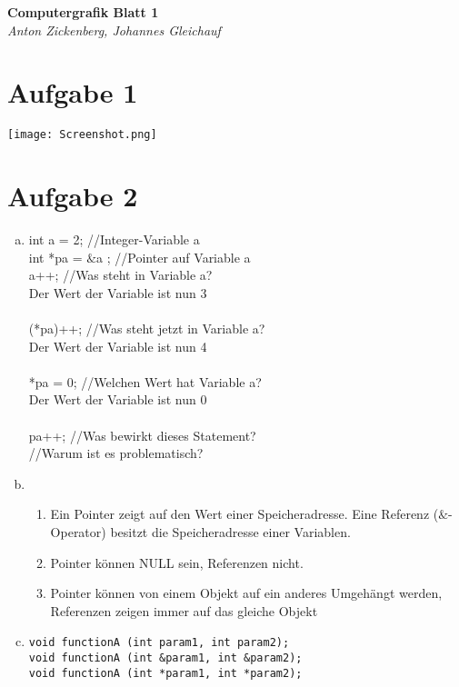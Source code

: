 \documentclass[12pt]{article}
\begin{document}
\begin{center}
 \textbf{\Large Computergrafik Blatt 1}\\
 \emph{Anton Zickenberg, Johannes Gleichauf}
\end{center}

\section*{Aufgabe 1}
\texttt{[image: Screenshot.png]}

\section*{Aufgabe 2}
\begin{enumerate}[a)]
\item int a = 2; //Integer-Variable a\\ 
	  int *pa = $\&$a ; //Pointer auf Variable a\\ 
	  a++; //Was steht in Variable a?\\ 
	  Der Wert der Variable ist nun 3\\
	  \\	  
	  (*pa)++; //Was steht jetzt in Variable a?\\ 
	  Der Wert der Variable ist nun 4\\
	  \\
	  *pa = 0; //Welchen Wert hat Variable a?\\
	  Der Wert der Variable ist nun 0\\
	  \\ 
	  pa++; //Was bewirkt dieses Statement?\\ 
	  		//Warum ist es problematisch?\\
\item 
\begin{enumerate}[1.]
\item Ein Pointer zeigt auf den Wert einer Speicheradresse. Eine Referenz ($\&$-Operator) besitzt die Speicheradresse einer Variablen. 
\item Pointer k\"onnen NULL sein, Referenzen nicht.
\item Pointer k\"onnen von einem Objekt auf ein anderes Umgeh\"angt werden, Referenzen zeigen immer auf das gleiche Objekt
\end{enumerate}
\item \begin{lstlisting}
void functionA (int param1, int param2);
void functionA (int &param1, int &param2);
void functionA (int *param1, int *param2);

\end{lstlisting}
\end{enumerate}
\end{document}
